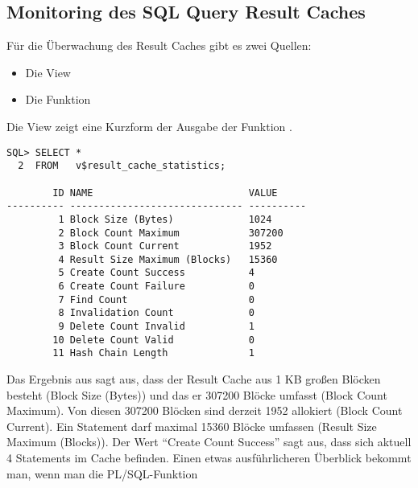       \subsection{Monitoring des SQL Query Result Caches}
        Für die Überwachung des Result Caches gibt es zwei Quellen:
        \begin{itemize}
          \item Die View 
          \item Die Funktion 
        \end{itemize}
        Die View  zeigt eine Kurzform der Ausgabe der Funktion .
        \begin{lstlisting}[caption={\identifier{v\$result\_cache\_statistics}},label=admin706,language=oracle_sql]
SQL> SELECT *
  2  FROM   v$result_cache_statistics;

        ID NAME                           VALUE
---------- ------------------------------ ----------
         1 Block Size (Bytes)             1024
         2 Block Count Maximum            307200
         3 Block Count Current            1952
         4 Result Size Maximum (Blocks)   15360
         5 Create Count Success           4
         6 Create Count Failure           0
         7 Find Count                     0
         8 Invalidation Count             0
         9 Delete Count Invalid           1
        10 Delete Count Valid             0
        11 Hash Chain Length              1
        \end{lstlisting}
        Das Ergebnis aus  sagt aus, dass der Result Cache aus
        1 KB großen Blöcken besteht (Block Size (Bytes)) und das er 307200
        Blöcke umfasst (Block Count Maximum). Von diesen 307200 Blöcken sind
        derzeit 1952 allokiert (Block Count Current). Ein Statement darf maximal
        15360 Blöcke umfassen (Result Size Maximum (Blocks)). Der Wert
        \enquote{Create Count Success} sagt aus, dass sich aktuell 4 Statements
        im Cache befinden. Einen etwas ausführlicheren Überblick bekommt
        man, wenn man die PL/SQL-Funktion

